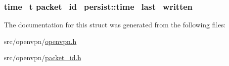 \subsubsection[{time\+\_\+last\+\_\+written}]{\setlength{\rightskip}{0pt plus 5cm}time\+\_\+t packet\+\_\+id\+\_\+persist\+::time\+\_\+last\+\_\+written}\label{structpacket__id__persist_aa07c048d293b427bc65166965bf8f6df}


The documentation for this struct was generated from the following files\+:\begin{DoxyCompactItemize}
\item 
src/openvpn/\hyperlink{openvpn_8h}{openvpn.\+h}\item 
src/openvpn/\hyperlink{packet__id_8h}{packet\+\_\+id.\+h}\end{DoxyCompactItemize}
